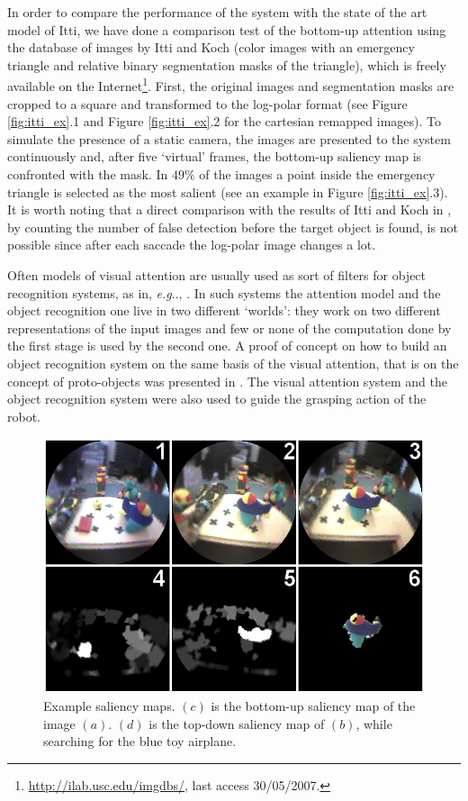 \documentclass{llncs}
\makeatletter
\DeclareRobustCommand\onedot{\futurelet\@let@token\@onedot}
\def\@onedot{\ifx\@let@token.\else.\null\fi\xspace}
\def\eg{\emph{e.g}\onedot} \def\Eg{\emph{E.g}\onedot}
\makeatother
\begin{document}
In order to compare the performance of the system
with the state of the art model of Itti, we
have done a comparison test of the bottom-up attention
using the database of images by Itti and Koch \cite{IttiK01b} (color
images with an emergency triangle and relative binary
segmentation masks of the triangle), which is freely
available on the Internet\footnote{\url{http://ilab.usc.edu/imgdbs/}, last access 30/05/2007.}.
First, the original images and segmentation masks are
cropped to a square and transformed to the log-polar
format (see Figure \ref{fig:itti_ex}.1 and Figure \ref{fig:itti_ex}.2
for the cartesian remapped images). To simulate the
presence of a static camera, the images are presented to
the system continuously and, after five `virtual'
frames, the bottom-up saliency map is confronted with
the mask. In $49\%$ of the images a point inside the
emergency triangle is selected as the most salient
(see an example in Figure \ref{fig:itti_ex}.3). It is worth noting that a
direct comparison with the results of Itti and Koch in \cite{IttiK01b}, by
counting the number of false detection before the
target object is found, is not possible since after each
saccade the log-polar image changes a lot.

Often models of visual attention are usually used as
sort of filters for object recognition systems, as in, \eg, \cite{WaltherK06}.
In such systems the attention model and the object recognition one
live in two different `worlds': they work on two
different representations of the input images and few or none
of the computation done by the first stage is used by the
second one. A proof of concept on how to build an object
recognition system on the same basis of the visual attention,
that is on the concept of proto-objects was presented in
\cite{Orabona07}. The visual attention system and the object recognition
system were also used to guide the grasping action of the robot.


\begin{figure}[!h]
  \begin{center}
    \includegraphics[width=0.9\linewidth]{./figs/attention/a3}
    \caption{Example saliency maps. $(c)$ is the 
     bottom-up saliency map of the image $(a)$. $(d)$ is the top-down
	   saliency map of $(b)$, while searching for the blue
	   toy airplane.}
    \label{fig:out_ex}
  \end{center}
\end{figure}
\end{document}
